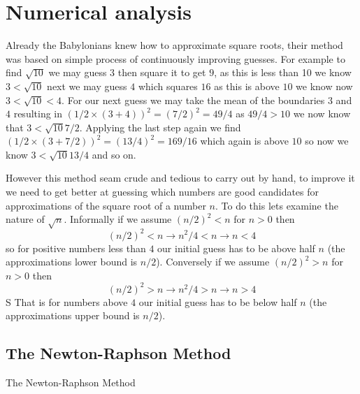 \chapter{Numerical analysis}
Already the Babylonians knew how to approximate square roots, their method was based on simple process of continuously improving guesses. For example to find $\sqrt{10}$ we may guess $3$ then square it to get $9$, as this is less than 10 we know $3 < \sqrt{10}$ next we may guess $4$ which squares $16$ as this is above $10$ we know now $3 < \sqrt{10} < 4$. For our next guess we may take the mean of the boundaries $3$ and $4$ resulting in $(1/2 \times (3+4))^2 = (7/2)^2 = 49/4$ as $49/4 > 10$ we now know that $3 < \sqrt{10} 7/2$. Applying the last step again we find $(1/2 \times (3 + 7/2))^2 = (13/4)^2 = 169/16$ which again is above $10$ so now we know $3 < \sqrt{10} 13/4$ and so on.

However this method seam crude and tedious to carry out by hand, to improve it we need to get better at guessing which numbers are good candidates for approximations of the square root of a number $n$. To do this lets examine the nature of $\sqrt{n}$. Informally if we assume $(n/2)^2 < n$ for $n>0$ then
\[
(n/2)^2 < n \rightarrow n^2/4 < n \rightarrow n < 4
\]
so for positive numbers less than $4$ our initial guess has to be above half $n$ (the approximations lower bound is $n/2$). Conversely if we assume $(n/2)^2 > n$ for $n>0$ then
\[
(n/2)^2 > n \rightarrow n^2/4 > n \rightarrow n > 4
\]
S
That is for numbers above $4$ our initial guess has to be below half $n$ (the approximations upper bound is $n/2$).

\section{The Newton-Raphson Method}
The Newton-Raphson Method

